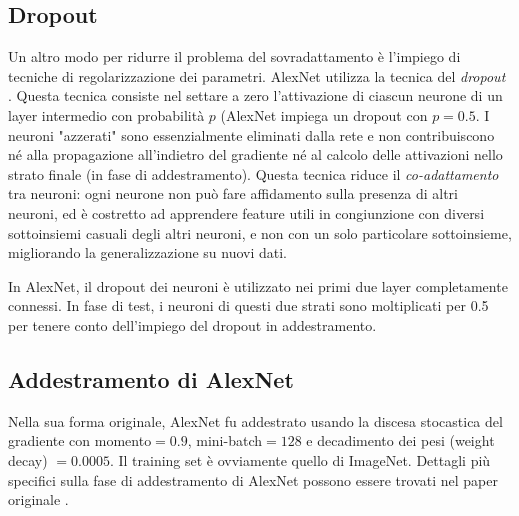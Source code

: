 \subsection{Dropout}
\label{dropout}
Un altro modo per ridurre il problema del sovradattamento è l'impiego di tecniche di regolarizzazione dei parametri. AlexNet utilizza la tecnica del \textit{dropout} \cite{dropout}. Questa tecnica consiste nel settare a zero l'attivazione di ciascun neurone di un layer intermedio con probabilità $p$ (AlexNet impiega un dropout con $p=0.5$. I neuroni "azzerati" sono essenzialmente eliminati dalla rete e non contribuiscono né alla propagazione all'indietro del gradiente né al calcolo delle attivazioni nello strato finale (in fase di addestramento). Questa tecnica riduce il \textit{co-adattamento} tra neuroni: ogni neurone non può fare affidamento sulla presenza di altri neuroni, ed è costretto ad apprendere feature utili in congiunzione con diversi sottoinsiemi casuali degli altri neuroni, e non con un solo particolare sottoinsieme, migliorando la generalizzazione su nuovi dati.

In AlexNet, il dropout dei neuroni è utilizzato nei primi due layer completamente connessi. In fase di test, i neuroni di questi due strati sono moltiplicati per 0.5 per tenere conto dell'impiego del dropout in addestramento.

\subsection{Addestramento di AlexNet}
Nella sua forma originale, AlexNet fu addestrato usando la discesa stocastica del gradiente con momento$=0.9$, mini-batch$=128$ e decadimento dei pesi (weight decay) $=0.0005$. Il training set è ovviamente quello di ImageNet. Dettagli più specifici sulla fase di addestramento di AlexNet possono essere trovati nel paper originale \cite{alexnet}.

